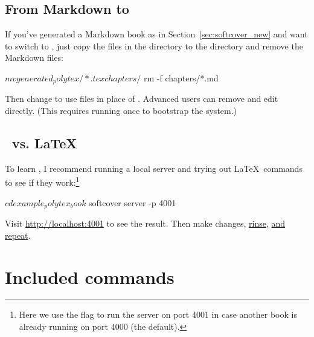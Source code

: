 \subsection{From Markdown to \PolyTeX} %
\label{sec:markdown_to_polytex}


If you've generated a Markdown book as in Section~\ref{sec:softcover_new} and want to switch to \PolyTeX, just copy the files in the  directory to the  directory and remove the Markdown files:

\begin{code}
$ mv generated_polytex/*.tex chapters/
$ rm -f chapters/*.md
\end{code}

\noindent Then change  to use  files in place of . Advanced users can remove  and edit  directly. (This requires running  once to bootstrap the system.)

\subsection{\PolyTeX\ vs. \LaTeX} %
\label{sec:polytex_vs_latex}

To learn \PolyTeX, I recommend running a local server and trying out \LaTeX\ commands to see if they work:\footnote{Here we use the  flag to run the server on port 4001 in case another book is already running on port 4000 (the default).}

\begin{code}
$ cd example_polytex_book
$ softcover server -p 4001
\end{code}

\noindent Visit \href{http://localhost:4001}{http://localhost:4001} to see the result. Then make changes, \href{http://www.urbandictionary.com/define.php?term=rinse%20repeat}{rinse}, \href{http://www.urbandictionary.com/define.php?term=rinse%20repeat}{and repeat}.





\section{Included commands} %
\label{sec:included_commands}

